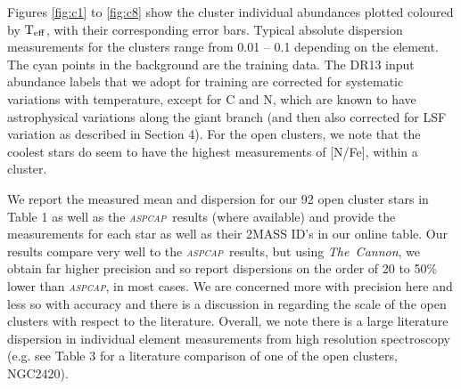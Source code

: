 \documentclass[14pt, preprint2]{aastex6}
\newcommand{\project}[1]{\textsl{#1}}
\newcommand{\tc}{\project{The~Cannon}}
\newcommand{\aspcap}{\project{\textsc{aspcap}}}
\newcommand{\teff}{\mbox{$\rm T_{eff}$}}
\begin{document}
Figures \ref{fig:c1} to \ref{fig:c8} show the cluster individual abundances plotted coloured by \teff, with their corresponding error bars. Typical absolute dispersion measurements for the clusters range from 0.01 -- 0.1 depending on the element.  The cyan points in the background are the training data. The DR13 input abundance labels that we adopt for training are corrected for systematic variations with temperature, except for C and N, which are known to have astrophysical variations along the giant branch (and then also corrected for LSF variation as described in Section 4). For the open clusters, we note that the coolest stars do seem to have the highest measurements of [N/Fe], within a cluster. 

We report the measured mean and dispersion for our 92 open cluster stars in Table 1 as well as the \aspcap\ results (where available) and provide the measurements for each star as well as their 2MASS ID's in our online table. Our results compare very well to the \aspcap\ results, but using \tc, we obtain far higher precision and so report dispersions on the order of 20 to 50\% lower than \aspcap, in most cases. We are concerned more with precision here and less so with accuracy and there is a discussion in \citet{Holtzman2015} regarding the scale of the open clusters with respect to the literature. Overall, we note there is a large literature dispersion in individual element measurements from high resolution spectroscopy (e.g. see Table 3 \citep{Souto2016} for a literature comparison of one of the open clusters, NGC2420). 
\end{document}
